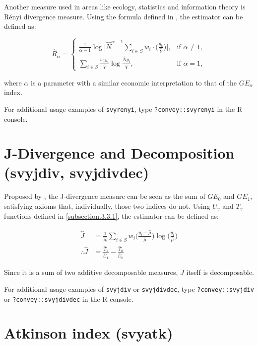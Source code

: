 \documentclass[]{book}
\begin{document}
Another measure used in areas like ecology, statistics and information
theory is Rényi divergence measure. Using the formula defined in
\citep{langel2012}, the estimator can be defined as:

\[
\widehat{R}_\alpha =
\begin{cases}
\frac{1}{\alpha - 1} \log \bigg[ \widehat{N}^{\alpha - 1} \sum_{i \in S} w_i \cdot \bigg( \frac{y_k}{ \widehat{Y} } \bigg) \bigg], &\text{if } \alpha \neq 1, \\
\sum_{i \in S} \frac{w_i y_i}{ \widehat{Y}} \log \frac{\widehat{N} y_i}{\widehat{Y}}, &\text{if } \alpha = 1,
\end{cases}
\]

where \(\alpha\) is a parameter with a similar economic interpretation
to that of the \(GE_\alpha\) index.

For additional usage examples of \texttt{svyrenyi}, type
\texttt{?convey::svyrenyi} in the R console.

\section{J-Divergence and Decomposition (svyjdiv,
svyjdivdec)}\label{j-divergence-and-decomposition-svyjdiv-svyjdivdec}

Proposed by \citep{rohde2016}, the J-divergence measure can be seen as
the sum of \(GE_0\) and \(GE_1\), satisfying axioms that, individually,
those two indices do not. Using \(U_\gamma\) and \(T_\gamma\) functions
defined in \ref{subsection.3.3.1}, the estimator can be defined as:

\[
\begin{aligned}
\widehat{J} &= \frac{1}{\widehat{N}} \sum_{i \in S} w_i \bigg( \frac{ y_i - \widehat{\mu} }{ \widehat{\mu} } \bigg) \log \bigg( \frac{y_i}{\widehat{\mu}} \bigg) \\
\therefore \widehat{J} &= \frac{\widehat{T}_1}{\widehat{U}_1} - \frac{ \widehat{T}_0 }{ \widehat{U}_0 }
\end{aligned}
\]

Since it is a sum of two additive decomposable measures, \(J\) itself is
decomposable.

For additional usage examples of \texttt{svyjdiv} or
\texttt{svyjdivdec}, type \texttt{?convey::svyjdiv} or
\texttt{?convey::svyjdivdec} in the R console.

\section{Atkinson index (svyatk)}\label{atkinson-index-svyatk}
\end{document}
